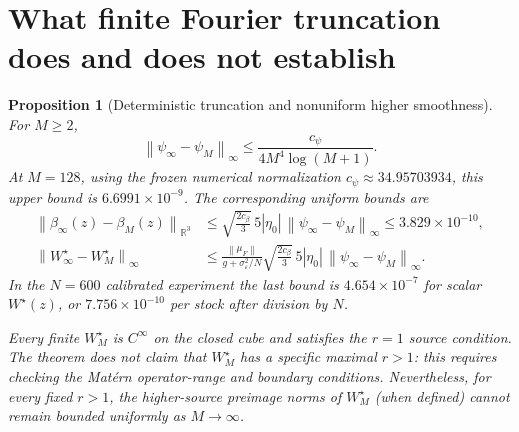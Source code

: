 \documentclass[11pt,a4paper]{article}
\newtheorem{proposition}[theorem]{Proposition}
\theoremstyle{remark}
\newcommand{\R}{\mathbb R}
\newcommand{\norm}[1]{\left\lVert#1\right\rVert}
\begin{document}
\section{What finite Fourier truncation does and does not establish}
\begin{proposition}[Deterministic truncation and nonuniform higher smoothness]\label{prop:trunc}
For $M\ge2$,
\begin{equation}\label{eq:tail}
 \norm{\psi_\infty-\psi_M}_{\infty}
 \le\frac{c_\psi}{4M^4\log(M+1)}.
\end{equation}
At $M=128$, using the frozen numerical normalization $c_\psi\approx34.95703934$, this upper bound is $6.6991\times10^{-9}$. The corresponding uniform bounds are
\begin{align}
 \norm{\beta_\infty(z)-\beta_M(z)}_{\R^3}
 &\le \sqrt{\frac{2c_\beta}{3}}\,5|\eta_0|\,\norm{\psi_\infty-\psi_M}_{\infty}
 \le 3.829\times10^{-10},\label{eq:betaerr}\\
 \norm{W_\infty^\star-W_M^\star}_{\infty}
 &\le\frac{\norm{\mu_F}}{g+\sigma_\varepsilon^2/N}
 \sqrt{\frac{2c_\beta}{3}}\,5|\eta_0|\,
 \norm{\psi_\infty-\psi_M}_{\infty}.
\end{align}
In the $N=600$ calibrated experiment the last bound is $4.654\times10^{-7}$ for scalar $W^\star(z)$, or $7.756\times10^{-10}$ per stock after division by $N$.

Every finite $W_M^\star$ is $C^\infty$ on the closed cube and satisfies the $r=1$ source condition. The theorem \emph{does not} claim that $W_M^\star$ has a specific maximal $r>1$: this requires checking the Mat\'ern operator-range and boundary conditions. Nevertheless, for every fixed $r>1$, the higher-source preimage norms of $W_M^\star$ (when defined) cannot remain bounded uniformly as $M\to\infty$.
\end{proposition}
\end{document}

